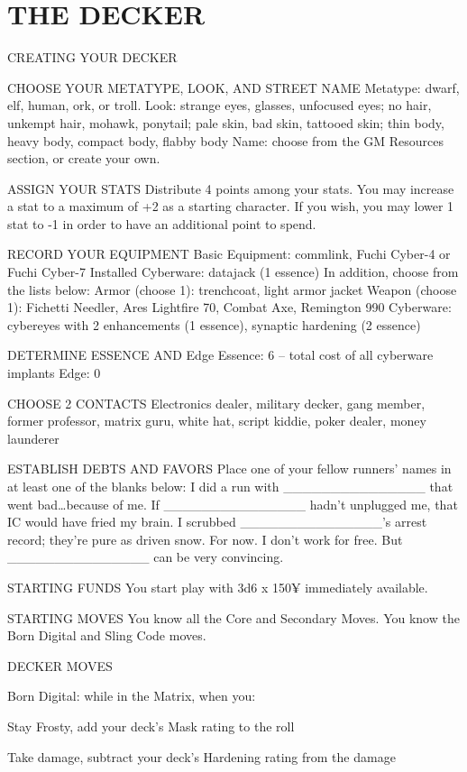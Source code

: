 \clearpage
\section{THE DECKER}
CREATING YOUR DECKER

CHOOSE YOUR METATYPE, LOOK, AND STREET NAME
Metatype: dwarf, elf, human, ork, or troll.
Look: strange eyes, glasses, unfocused eyes; no hair, unkempt hair, mohawk, ponytail; pale skin, bad skin, tattooed skin; thin body, heavy body, compact body, flabby body
Name: choose from the GM Resources section, or create your own.

ASSIGN YOUR STATS
Distribute 4 points among your stats. You may increase a stat to a maximum of +2 as a starting character. If you wish, you may lower 1 stat to -1 in order to have an additional point to spend.

RECORD YOUR EQUIPMENT
Basic Equipment: commlink, Fuchi Cyber-4 or Fuchi Cyber-7
Installed Cyberware: datajack (1 essence)
In addition, choose from the lists below:
Armor (choose 1): trenchcoat, light armor jacket
Weapon (choose 1): Fichetti Needler, Ares Lightfire 70, Combat Axe, Remington 990
Cyberware: cybereyes with 2 enhancements (1 essence), synaptic hardening (2 essence)

DETERMINE ESSENCE AND Edge
Essence: 6 – total cost of all cyberware implants
Edge: 0

CHOOSE 2 CONTACTS
Electronics dealer, military decker, gang member, former professor, matrix guru, white hat, script kiddie, poker dealer, money launderer

ESTABLISH DEBTS AND FAVORS
Place one of your fellow runners’ names in at least one of the blanks below:
I did a run with \_\_\_\_\_\_\_\_\_\_\_\_\_\_\_ that went bad…because of me.
If \_\_\_\_\_\_\_\_\_\_\_\_\_\_\_ hadn’t unplugged me, that IC would have fried my brain.
I scrubbed \_\_\_\_\_\_\_\_\_\_\_\_\_\_\_’s arrest record; they’re pure as driven snow. For now.
I don’t work for free. But \_\_\_\_\_\_\_\_\_\_\_\_\_\_\_ can be very convincing.

STARTING FUNDS
You start play with 3d6 x 150¥ immediately available.

STARTING MOVES
You know all the Core and Secondary Moves. You know the Born Digital and Sling Code moves.

DECKER MOVES

Born Digital: while in the Matrix, when you:

Stay Frosty, add your deck’s Mask rating to the roll

Take damage, subtract your deck’s Hardening rating from the damage

